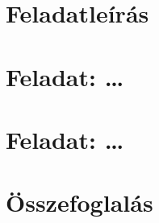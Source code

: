 \documentclass[fleqn,12pt]{article}
\begin{document}



\section{Feladatleírás}

\section{Feladat: \dots}



\section{Feladat: \dots}



\section{Összefoglalás}


% 


\end{document}
